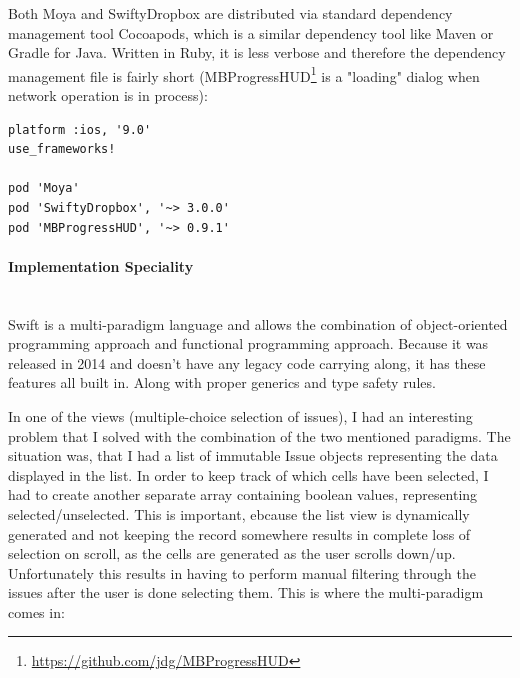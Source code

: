 \bigbreak

Both Moya and SwiftyDropbox are distributed via standard dependency management tool Cocoapods, which is a similar dependency tool like Maven or Gradle for Java. Written in Ruby, it is less verbose and therefore the dependency management file is fairly short (MBProgressHUD\footnote{\url{https://github.com/jdg/MBProgressHUD}} is a "loading" dialog when network operation is in process):

\bigbreak

\begin{lstlisting}
platform :ios, '9.0'
use_frameworks!

pod 'Moya'
pod 'SwiftyDropbox', '~> 3.0.0'
pod 'MBProgressHUD', '~> 0.9.1'
\end{lstlisting}

\newpage

\paragraph{Implementation Speciality}\mbox{}\\

Swift is a multi-paradigm language and allows the combination of object-oriented programming approach and functional programming approach. Because it was released in 2014 and doesn't have any legacy code carrying along, it has these features all built in. Along with proper generics and type safety rules. 

In one of the views (multiple-choice selection of issues), I had an interesting problem that I solved with the combination of the two mentioned paradigms. The situation was, that I had a list of immutable Issue objects representing the data displayed in the list. In order to keep track of which cells have been selected, I had to create another separate array containing boolean values, representing selected/unselected. This is important, ebcause the list view is dynamically generated and not keeping the record somewhere results in complete loss of selection on scroll, as the cells are generated as the user scrolls down/up. Unfortunately this results in having to perform manual filtering through the issues after the user is done selecting them. This is where the multi-paradigm comes in:

\bigbreak

